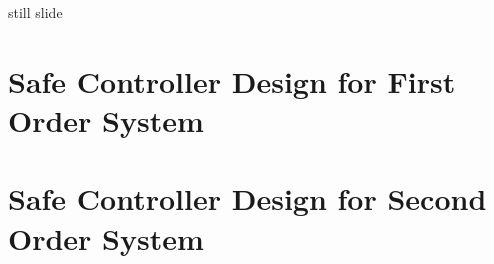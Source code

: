 still slide

\section{Safe Controller Design for First Order System}

\section{Safe Controller Design for Second Order System}